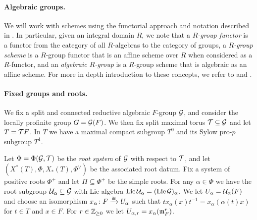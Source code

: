 \paragraph{Algebraic groups.} We will work with schemes using the functorial approach and notation described in \cite{Jan}. In particular, given an integral domain $R$, we note that a \emph{$R$-group functor} is a functor from the category of all $R$-algebras to the category of groups, a \emph{$R$-group scheme} is a $R$-group functor that is an affine scheme over $R$ when considered as a $R$-functor, and an \emph{algebraic $R$-group} is a $R$-group scheme that is algebraic as an affine scheme. For more in depth introduction to these concepts, we refer to \cite{Con-book} and \cite{Jan}.

\paragraph{Fixed groups and roots.} We fix a split and connected reductive algebraic $F$-group $\mathcal{G}$, and consider the locally profinite group $G = \mathcal{G}(F)$. We then fix split maximal torus $\mathcal{T} \subseteq \mathcal{G}$ and let $T = \mathcal{T}{F}$. In $T$ we have a maximal compact subgroup $T^{0}$ and its Sylow pro-$p$ subgroup $T^{1}$.

Let $\Phi = \Phi(\mathcal{G},\mathcal{T})$ be the \emph{root system} of $\mathcal{G}$ with respect to $\mathcal{T}$, and let $(X^{*}(T),\Phi,X_{*}(T),\Phi^{\vee})$ be the associated root datum. Fix a system of positive roots $\Phi^{+}$ and let $\Pi \subseteq \Phi^{+}$ be the simple roots. For any $\alpha \in \Phi$ we have the root subgroup $\mathcal{U}_{\alpha} \subseteq \mathcal{G}$ with Lie algebra $\operatorname{Lie} \mathcal{U}_{\alpha} =  (\operatorname{Lie} \mathcal{G})_{\alpha}$. We let $U_{\alpha} = \mathcal{U}_{\alpha}(F)$ and choose an isomorphism $x_{\alpha} \colon F \xrightarrow{\cong} U_{\alpha}$ such that $tx_{\alpha}(x)t^{-1} = x_{\alpha}(\alpha(t)x)$ for $t \in T$ and $x \in F$. For $r \in \mathbb{Z}_{\geq 0}$ we let $U_{\alpha,r} = x_{\alpha}(\mathfrak{m}_{F}^{r})$.

